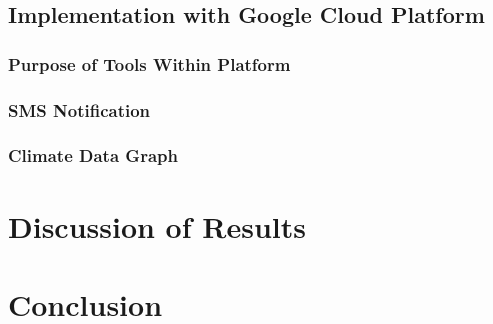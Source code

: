 \documentclass{article}
\begin{document}
\subsection{Implementation with Google Cloud Platform }
\label{section:gcp}


\subsubsection{Purpose of Tools Within Platform}


\subsubsection{SMS Notification}


\subsubsection{Climate Data Graph}

\section{Discussion of Results}

\section{Conclusion}
\end{document}
